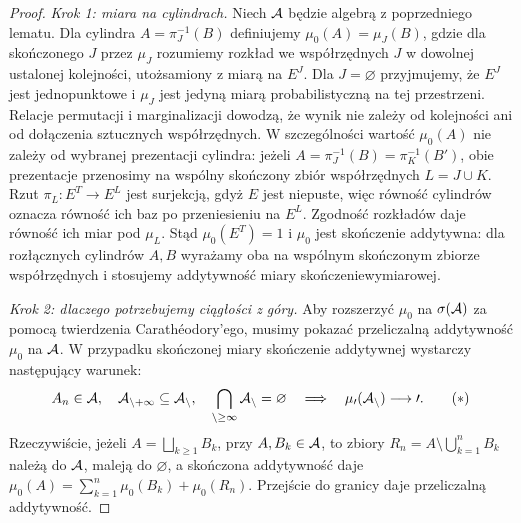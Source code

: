 \begin{proof}
\emph{Krok 1: miara na cylindrach.}
Niech $\cal A$ będzie algebrą z poprzedniego lematu.
Dla cylindra $A=\pi_J^{-1}(B)$ definiujemy
$\mu_0(A)=\mu_J(B)$, gdzie dla skończonego $J$
przez $\mu_J$ rozumiemy rozkład we współrzędnych $J$
w dowolnej ustalonej kolejności, utożsamiony z miarą na $E^J$.
Dla $J=\varnothing$ przyjmujemy, że $E^J$ jest jednopunktowe
i $\mu_J$ jest jedyną miarą probabilistyczną na tej przestrzeni. Relacje permutacji i
marginalizacji dowodzą, że wynik nie zależy od kolejności
ani od dołączenia sztucznych współrzędnych. W szczególności
wartość $\mu_0(A)$ nie zależy od wybranej prezentacji
cylindra: jeżeli $A=\pi_J^{-1}(B)=\pi_K^{-1}(B')$,
obie prezentacje przenosimy na wspólny skończony
zbiór współrzędnych $L=J\cup K$.
Rzut $\pi_L:E^T\to E^L$ jest surjekcją, gdyż $E$ jest
niepuste, więc równość cylindrów oznacza równość ich
baz po przeniesieniu na $E^L$. Zgodność rozkładów daje
równość ich miar pod $\mu_L$.
Stąd $\mu_0(E^T)=1$ i $\mu_0$ jest skończenie addytywna:
dla rozłącznych cylindrów $A,B$ wyrażamy oba na
wspólnym skończonym zbiorze współrzędnych i stosujemy
addytywność miary skończeniewymiarowej.

\emph{Krok 2: dlaczego potrzebujemy ciągłości z góry.}
Aby rozszerzyć $\mu_0$ na $\sigma(\cal A)$ za pomocą
twierdzenia Carathéodory'ego, musimy pokazać przeliczalną
addytywność $\mu_0$ na $\cal A$. W przypadku skończonej
miary skończenie addytywnej wystarczy następujący warunek:
\[
A_n\in\cal A,\quad A_{n+1}\subseteq A_n,\quad
\bigcap_{n\ge1}A_n=\varnothing
\quad\Longrightarrow\quad \mu_0(A_n)\longrightarrow0.
\tag{$*$}
\]
Rzeczywiście, jeżeli $A=\bigsqcup_{k\ge1}B_k$,
przy $A,B_k\in\cal A$, to zbiory
$R_n=A\setminus\bigcup_{k=1}^n B_k$ należą do $\cal A$,
maleją do $\varnothing$, a skończona addytywność daje
$\mu_0(A)=\sum_{k=1}^n\mu_0(B_k)+\mu_0(R_n)$.
Przejście do granicy daje przeliczalną addytywność.


\end{proof}
